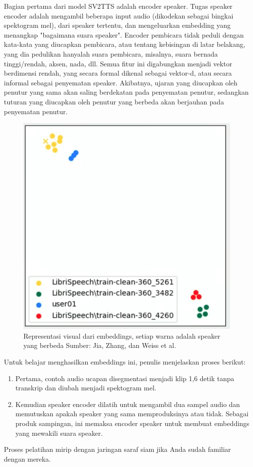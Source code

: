 Bagian pertama dari model SV2TTS adalah encoder speaker.
Tugas speaker encoder adalah mengambil beberapa input audio (dikodekan sebagai bingkai spektogram mel), dari speaker tertentu, dan mengeluarkan embedding yang menangkap "bagaimana suara speaker". Encoder pembicara tidak peduli dengan kata-kata yang diucapkan pembicara, atau tentang kebisingan di latar belakang, yang dia pedulikan hanyalah suara pembicara, misalnya, suara bernada tinggi/rendah, aksen, nada, dll. Semua fitur ini digabungkan menjadi vektor berdimensi rendah, yang secara formal dikenal sebagai vektor-d, atau secara informal sebagai penyematan speaker. Akibatnya, ujaran yang diucapkan oleh penutur yang sama akan saling berdekatan pada penyematan penutur, sedangkan tuturan yang diucapkan oleh penutur yang berbeda akan berjauhan pada penyematan penutur.
\begin{figure}[H]
        \centerline{\includegraphics[scale=.35]{figures/encoder}}
        \caption{Representasi visual dari embeddings, setiap warna adalah speaker yang berbeda Sumber: Jia, Zhang, dan Weiss et al.}
		\label{encoder}
\end{figure}

Untuk belajar menghasilkan embeddings ini, penulis menjelaskan proses berikut:
\begin{enumerate}
\item Pertama, contoh audio ucapan disegmentasi menjadi klip 1,6 detik tanpa transkrip dan diubah menjadi spektogram mel.
\item Kemudian speaker encoder dilatih untuk mengambil dua sampel audio dan memutuskan apakah speaker yang sama memproduksinya atau tidak. Sebagai produk sampingan, ini memaksa encoder speaker untuk membuat embeddings yang mewakili suara speaker.
\end{enumerate}
Proses pelatihan mirip dengan jaringan saraf siam jika Anda sudah familiar dengan mereka.

